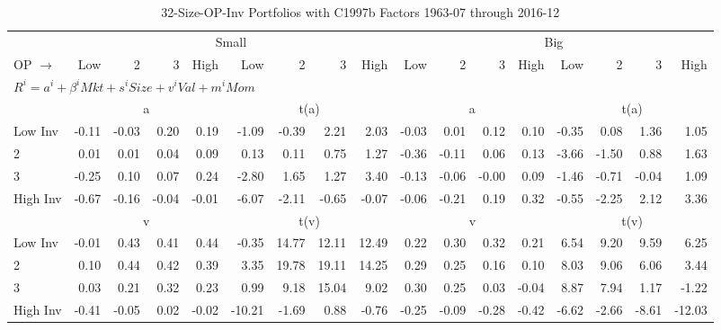 
\begin{table}[!ht]
\centering
\caption{32-Size-OP-Inv Portfolios with C1997b Factors 1963-07 through 2016-12}
\begin{tabular}{lrrrrrrrrrrrrrrrr}
  \toprule
    & \multicolumn{8}{c}{Small} & \multicolumn{8}{c}{Big} \\
      \cmidrule(r){2-9} \cmidrule(r){10-17}
    OP $\rightarrow$ & Low & 2 & 3 & High & Low & 2 & 3 & High & Low & 2 & 3 & High & Low & 2 & 3 & High \\ 
  \midrule
  \multicolumn{17}{l}{$R^i=a^i+\beta^iMkt+s^iSize+v^iVal+m^iMom$} \\

  
    
      & \multicolumn{4}{c}{a} & \multicolumn{4}{c}{t(a)}
    
      & \multicolumn{4}{c}{a} & \multicolumn{4}{c}{t(a)}
    
    \\
      \cmidrule(r){2-5} \cmidrule(r){6-9} \cmidrule(r){10-13} \cmidrule(r){14-17}

    Low Inv   & -0.11  & -0.03  & 0.20  & 0.19  & -1.09  & -0.39  & 2.21  & 2.03  & -0.03  & 0.01  & 0.12  & 0.10  & -0.35  & 0.08  & 1.36  & 1.05  \\
           2  & 0.01  & 0.01  & 0.04  & 0.09  & 0.13  & 0.11  & 0.75  & 1.27  & -0.36  & -0.11  & 0.06  & 0.13  & -3.66  & -1.50  & 0.88  & 1.63  \\
           3  & -0.25  & 0.10  & 0.07  & 0.24  & -2.80  & 1.65  & 1.27  & 3.40  & -0.13  & -0.06  & -0.00  & 0.09  & -1.46  & -0.71  & -0.04  & 1.09  \\
    High Inv  & -0.67  & -0.16  & -0.04  & -0.01  & -6.07  & -2.11  & -0.65  & -0.07  & -0.06  & -0.21  & 0.19  & 0.32  & -0.55  & -2.25  & 2.12  & 3.36  \\

  
    
      & \multicolumn{4}{c}{v} & \multicolumn{4}{c}{t(v)}
    
      & \multicolumn{4}{c}{v} & \multicolumn{4}{c}{t(v)}
    
    \\
      \cmidrule(r){2-5} \cmidrule(r){6-9} \cmidrule(r){10-13} \cmidrule(r){14-17}

    Low Inv   & -0.01  & 0.43  & 0.41  & 0.44  & -0.35  & 14.77  & 12.11  & 12.49  & 0.22  & 0.30  & 0.32  & 0.21  & 6.54  & 9.20  & 9.59  & 6.25  \\
           2  & 0.10  & 0.44  & 0.42  & 0.39  & 3.35  & 19.78  & 19.11  & 14.25  & 0.29  & 0.25  & 0.16  & 0.10  & 8.03  & 9.06  & 6.06  & 3.44  \\
           3  & 0.03  & 0.21  & 0.32  & 0.23  & 0.99  & 9.18  & 15.04  & 9.02  & 0.30  & 0.25  & 0.03  & -0.04  & 8.87  & 7.94  & 1.17  & -1.22  \\
    High Inv  & -0.41  & -0.05  & 0.02  & -0.02  & -10.21  & -1.69  & 0.88  & -0.76  & -0.25  & -0.09  & -0.28  & -0.42  & -6.62  & -2.66  & -8.61  & -12.03  \\


\end{tabular}
\end{table}
